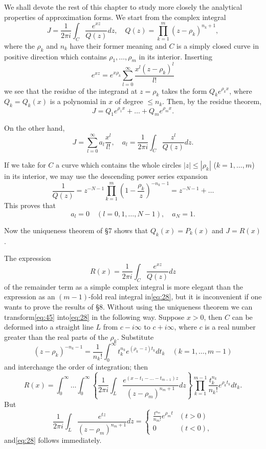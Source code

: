 We shall devote the rest of this chapter to study more closely the analytical properties of approximation forms. We start from the complex integral
\begin{equation} J = \frac{1}{2\pi i} \int_C \frac{e^{xz}}{Q(z)} dz, \quad Q(z) = \prod_{k=1}^{m} (z - \rho_k)^{n_k+1}, \tag{44}\label{eq:44} \end{equation}
where the $\rho_k$ and $n_k$ have their former meaning and $C$ is a simply closed curve in positive direction which contains $\rho_1, \ldots, \rho_m$ in its interior. Inserting
\[ e^{xz} = e^{x\rho_k} \sum_{l=0}^{\infty} \frac{x^l (z-\rho_k)^l}{l!} \]
we see that the residue of the integrand at $z=\rho_k$ takes the form $Q_k e^{\rho_k x}$, where $Q_k=Q_k(x)$ is a polynomial in $x$ of degree $\leq n_k$. Then, by the residue theorem,
\[ J = Q_1 e^{\rho_1 x} + \dots + Q_m e^{\rho_m x}. \]

On the other hand,
\[ J = \sum_{l=0}^{\infty} a_l \frac{x^l}{l!}, \quad a_l = \frac{1}{2\pi i} \int_C \frac{z^l}{Q(z)} dz. \]

If we take for $C$ a curve which contains the whole circles $|z| \leq |\rho_k|$ ($k=1,\dots,m$) in its interior, we may use the descending power series expansion
\[ \frac{1}{Q(z)} = z^{-N-1} \prod_{k=1}^{m} \left(1 - \frac{\rho_k}{z}\right)^{-n_k-1} = z^{-N-1} + \dots \]
This proves that
\[ a_l = 0 \quad (l=0,1,\dots,N-1), \quad a_N = 1. \]

Now the uniqueness theorem of \S 7 shows that $Q_k(x) = P_k(x)$ and $J = R(x)$.

The expression
\begin{equation} R(x) = \frac{1}{2\pi i} \int_C \frac{e^{xz}}{Q(z)} dz \tag{45}\label{eq:45} \end{equation}
of the remainder term as a simple complex integral is more elegant than the expression as an $(m-1)$-fold real integral in\eqref{eq:28}, but it is inconvenient if one wants to prove the results of \S 8. Without using the uniqueness theorem we can transform\eqref{eq:45} into\eqref{eq:28} in the following way. Suppose $x>0$, then $C$ can be deformed into a straight line $L$ from $c-i\infty$ to $c+i\infty$, where $c$ is a real number greater than the real parts of the $\rho_k$. Substitute
\[ (z-\rho_k)^{-n_k-1} = \frac{1}{n_k!} \int_0^\infty t_k^{n_k} e^{(\rho_k-z)t_k} dt_k \quad (k=1,\dots,m-1) \]
and interchange the order of integration; then
\[ R(x) = \int_0^{\infty} \dots \int_0^{\infty} \left\{ \frac{1}{2\pi i} \int_L \frac{e^{(x-t_1-\dots-t_{m-1})z}}{(z-\rho_m)^{n_m+1}} dz \right\} \prod_{k=1}^{m-1} \frac{t_k^{n_k}}{n_k!} e^{\rho_k t_k} dt_k. \]
But
\[ \frac{1}{2\pi i} \int_L \frac{e^{tz}}{(z-\rho_m)^{n_m+1}} dz = \begin{cases} \frac{t^{n_m}}{n_m!} e^{\rho_m t} & (t>0) \\ 0 & (t<0), \end{cases} \]
and\eqref{eq:28} follows immediately.

